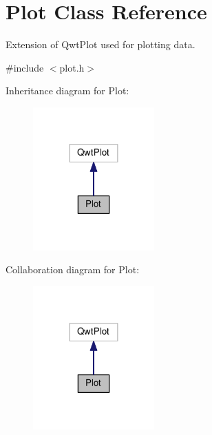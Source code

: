 \hypertarget{classPlot}{}\section{Plot Class Reference}
\label{classPlot}


Extension of Qwt\+Plot used for plotting data.  




{\ttfamily \#include $<$plot.\+h$>$}



Inheritance diagram for Plot\+:\nopagebreak
\begin{figure}[H]
\begin{center}
\leavevmode
\includegraphics[width=132pt]{classPlot__inherit__graph}
\end{center}
\end{figure}


Collaboration diagram for Plot\+:\nopagebreak
\begin{figure}[H]
\begin{center}
\leavevmode
\includegraphics[width=132pt]{classPlot__coll__graph}
\end{center}
\end{figure}
